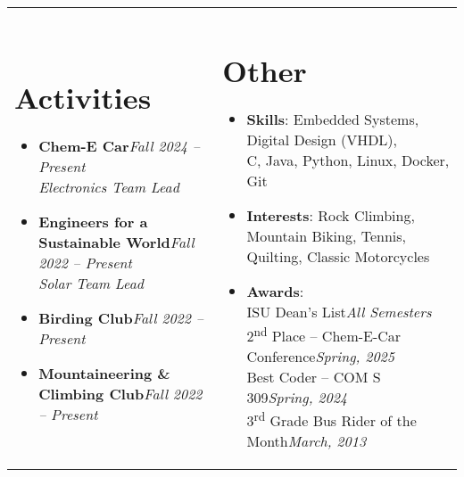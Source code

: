 \documentclass[letterpaper,10pt]{article}
\newcommand{\resumeItem}[2]{
  \item\small{
    \textbf{#1}{: #2 \vspace{-2pt}}
  }
}
\newcommand{\resumeSubItem}[2]{\resumeItem{#1}{#2}\vspace{-4pt}}
\newcommand{\resumeSubHeadingTightListStart}{\begin{itemize}[leftmargin=*]\setlength\itemsep{.6em}}
\newcommand{\resumeSubHeadingTightListEnd}{\end{itemize}}
\newcommand{\datesmall}[1]{\textit{\small{#1}}}
\begin{document}
%
% 
\noindent
\begin{tabular*}{\textwidth}{@{\extracolsep{\fill}} l l}

\parbox[t]{0.53\textwidth}{
\vspace{-3pt}
\section*{Activities}
\resumeSubHeadingTightListStart
  \item{
    \textbf{Chem-E Car}\hfill\datesmall{Fall 2024 -- Present}\\
    \textit{Electronics Team Lead}
  }
  \item{
    \textbf{Engineers for a Sustainable World}\hfill\datesmall{Fall 2022 -- Present}\\
    \textit{Solar Team Lead}
  }
  \item{
    \textbf{Birding Club}\hfill\datesmall{Fall 2022 -- Present}
  }
  \item{
    \textbf{Mountaineering \& Climbing Club}\hfill\datesmall{Fall 2022 -- Present}
  }
\resumeSubHeadingTightListEnd
}

&

\parbox[t]{0.43\textwidth}{
\vspace{-3pt}
\section*{Other}
\resumeSubHeadingTightListStart
    \resumeSubItem{Skills}{Embedded Systems, Digital Design (VHDL),\\ C, Java, Python, Linux, Docker, Git}
    \resumeSubItem{Interests}{Rock Climbing, Mountain Biking, Tennis, Quilting, Classic Motorcycles}
    \resumeSubItem{Awards}{
        \\ISU Dean's List\hfill\datesmall{All Semesters}
        \\2\textsuperscript{nd} Place -- Chem-E-Car Conference\hfill\datesmall{Spring, 2025}
        \\Best Coder -- COM S 309\hfill\datesmall{Spring, 2024}
        \\3\textsuperscript{rd} Grade Bus Rider of the Month\hfill\datesmall{March, 2013}
        \\
        }
\resumeSubHeadingTightListEnd
}

\end{tabular*}

\end{document}
